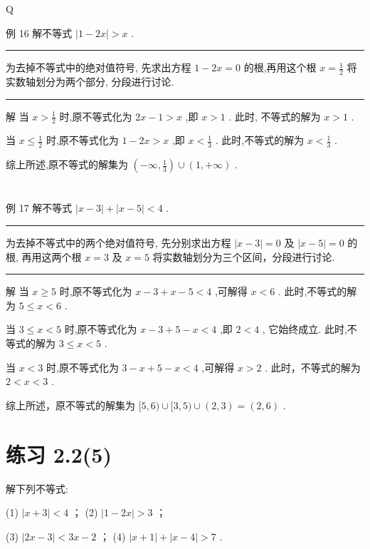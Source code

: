 \documentclass[10pt]{article}
\newcommand{\HRule}{\begin{center}\rule{0.9\linewidth}{0.2mm}\end{center}}
\begin{document}
Q

例 16 解不等式 \(\left| {1 - {2x}}\right|  > x\) .

\HRule

为去掉不等式中的绝对值符号, 先求出方程 \(1 - {2x} = 0\) 的根,再用这个根 \(x = \frac{1}{2}\) 将实数轴划分为两个部分, 分段进行讨论.

\HRule

解 当 \(x > \frac{1}{2}\) 时,原不等式化为 \({2x} - 1 > x\) ,即 \(x > 1\) . 此时, 不等式的解为 \(x > 1\) .

当 \(x \leq  \frac{1}{2}\) 时,原不等式化为 \(1 - {2x} > x\) ,即 \(x < \frac{1}{3}\) . 此时,不等式的解为 \(x < \frac{1}{3}\) .

综上所述,原不等式的解集为 \(\left( {-\infty ,\frac{1}{3}}\right)  \cup  \left( {1, + \infty }\right)\) .

\section*{}



例 17 解不等式 \(\left| {x - 3}\right|  + \left| {x - 5}\right|  < 4\) .

\HRule

为去掉不等式中的两个绝对值符号, 先分别求出方程 \(\left| {x - 3}\right|  = 0\) 及 \(\left| {x - 5}\right|  = 0\) 的根, 再用这两个根 \(x = 3\) 及 \(x = 5\) 将实数轴划分为三个区间，分段进行讨论.

\HRule

解 当 \(x \geq  5\) 时,原不等式化为 \(x - 3 + x - 5 < 4\) ,可解得 \(x < 6\) . 此时,不等式的解为 \(5 \leq  x < 6\) .

当 \(3 \leq  x < 5\) 时,原不等式化为 \(x - 3 + 5 - x < 4\) ,即 \(2 < 4\) , 它始终成立. 此时,不等式的解为 \(3 \leq  x < 5\) .

当 \(x < 3\) 时,原不等式化为 \(3 - x + 5 - x < 4\) ,可解得 \(x > 2\) . 此时，不等式的解为 \(2 < x < 3\) .

综上所述，原不等式的解集为 \(\lbrack 5,6) \cup  \lbrack 3,5) \cup  \left( {2,3}\right)  = \left( {2,6}\right)\) .

\section*{练习 2.2(5)}

解下列不等式:

(1) \(\left| {x + 3}\right|  < 4\) ； (2) \(\left| {1 - {2x}}\right|  > 3\) ；

(3) \(\left| {{2x} - 3}\right|  < {3x} - 2\) ； (4) \(\left| {x + 1}\right|  + \left| {x - 4}\right|  > 7\) .
\end{document}
